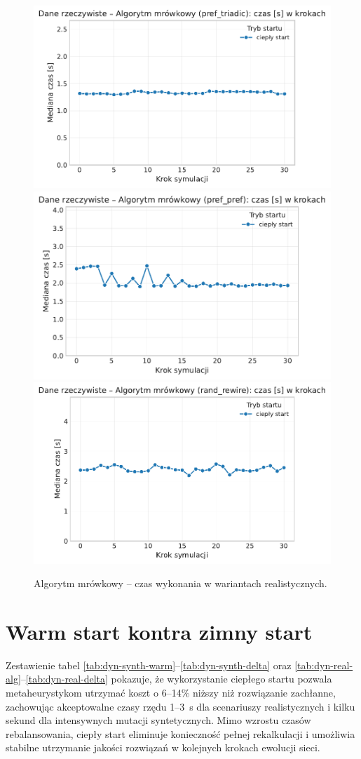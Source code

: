 \begin{figure}[H]
  \centering
  \includegraphics[width=0.62\linewidth]{assets/figures/dynamic/real/real_algorytm_mrowkowy_time_over_steps_pref_triadic.pdf}\\[0.4em]
  \includegraphics[width=0.62\linewidth]{assets/figures/dynamic/real/real_algorytm_mrowkowy_time_over_steps_pref_pref.pdf}\\[0.4em]
  \includegraphics[width=0.62\linewidth]{assets/figures/dynamic/real/real_algorytm_mrowkowy_time_over_steps_rand_rewire.pdf}
  \caption{Algorytm mrówkowy -- czas wykonania w wariantach realistycznych.}
  \label{fig:dyn-real-aco-time}
\end{figure}

\section{Warm start kontra zimny start}

Zestawienie tabel \ref{tab:dyn-synth-warm}--\ref{tab:dyn-synth-delta} oraz \ref{tab:dyn-real-alg}--\ref{tab:dyn-real-delta} pokazuje, że wykorzystanie ciepłego startu pozwala metaheurystykom utrzymać koszt o 6--14\% niższy niż rozwiązanie zachłanne, zachowując akceptowalne czasy rzędu 1--3~s dla scenariuszy realistycznych i kilku sekund dla intensywnych mutacji syntetycznych. Mimo wzrostu czasów rebalansowania, ciepły start eliminuje konieczność pełnej rekalkulacji i umożliwia stabilne utrzymanie jakości rozwiązań w kolejnych krokach ewolucji sieci.
